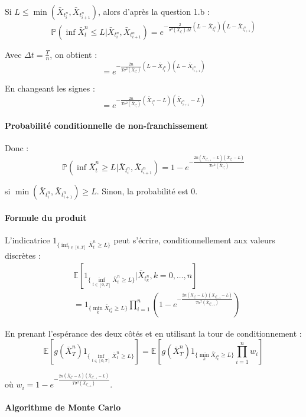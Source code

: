 \documentclass[12pt,a4paper]{article}
\theoremstyle{definition}
\theoremstyle{remark}
\newcommand{\E}{\mathbb{E}}
\newcommand{\Prob}{\mathbb{P}}
\begin{document}
Si $L \leq \min(\bar{X}_{t_i^n}, \bar{X}_{t_{i+1}^n})$, alors d'après la question 1.b :
\[
\Prob\left(\inf \bar{X}_t^n \leq L \Big| \bar{X}_{t_i^n}, \bar{X}_{t_{i+1}^n}\right) = e^{-\frac{2}{\sigma^2(\bar{X}_{t_i^n})\Delta t}(L - \bar{X}_{t_i^n})(L - \bar{X}_{t_{i+1}^n})}
\]

Avec $\Delta t = \frac{T}{n}$, on obtient :
\[
= e^{-\frac{2n}{T\sigma^2(\bar{X}_{t_i^n})}(L - \bar{X}_{t_i^n})(L - \bar{X}_{t_{i+1}^n})}
\]

En changeant les signes :
\[
= e^{-\frac{2n}{T\sigma^2(\bar{X}_{t_i^n})}(\bar{X}_{t_i^n} - L)(\bar{X}_{t_{i+1}^n} - L)}
\]

\paragraph{Probabilité conditionnelle de non-franchissement}

Donc :
\[
\Prob\left(\inf \bar{X}_t^n \geq L \Big| \bar{X}_{t_i^n}, \bar{X}_{t_{i+1}^n}\right) = 1 - e^{-\frac{2n(\bar{X}_{t_{i+1}^n}-L)(\bar{X}_{t_i^n}-L)}{T\sigma^2(\bar{X}_{t_i^n})}}
\]

si $\min(\bar{X}_{t_i^n}, \bar{X}_{t_{i+1}^n}) \geq L$. Sinon, la probabilité est $0$.

\paragraph{Formule du produit}

L'indicatrice $1_{\{\inf_{t \in [0,T]} \bar{X}_t^n \geq L\}}$ peut s'écrire, conditionnellement aux valeurs discrètes :
\begin{align*}
&\E[1_{\{\inf_{t \in [0,T]} \bar{X}_t^n \geq L\}} | \bar{X}_{t_k^n}, k=0,\ldots,n] \\
&= 1_{\{\min_{k} \bar{X}_{t_k^n} \geq L\}} \prod_{i=1}^n \left(1 - e^{-\frac{2n(\bar{X}_{t_i^n}-L)(\bar{X}_{t_{i-1}^n}-L)}{T\sigma^2(\bar{X}_{t_{i-1}^n})}}\right)
\end{align*}

En prenant l'espérance des deux côtés et en utilisant la tour de conditionnement :
\[
\E[g(\bar{X}_T^n)1_{\{\inf_{t \in [0,T]} \bar{X}_t^n \geq L\}}] = \E\left[g(\bar{X}_T^n)1_{\{\min_{k} \bar{X}_{t_k^n} \geq L\}} \prod_{i=1}^n w_i\right]
\]

où $w_i = 1 - e^{-\frac{2n(\bar{X}_{t_i^n}-L)(\bar{X}_{t_{i-1}^n}-L)}{T\sigma^2(\bar{X}_{t_{i-1}^n})}}$.

\paragraph{Algorithme de Monte Carlo}
\end{document}
